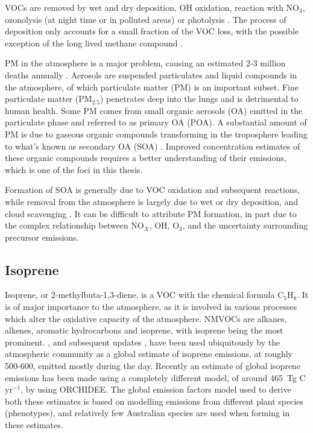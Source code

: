   VOCs are removed by wet and dry deposition, OH oxidation, reaction with NO$_3$, ozonolysis (at night time or in polluted areas) or photolysis \citep{AtkinsonArey2003, Brown2009}.
  The process of deposition only accounts for a small fraction of the VOC loss, with the possible exception of the long lived methane compound \citep{AtkinsonArey2003}.
  
  PM in the atmosphere is a major problem, causing an estimated 2-3 million deaths annually \citep{Hoek2013, Krewski2009, Silva2013, Lelieveld2015}. 
  Aerosols are suspended particulates and liquid compounds in the atmosphere, of which particulate matter (PM) is an important subset.
  Fine particulate matter (PM$_{2.5}$) penetrates deep into the lungs and is detrimental to human health.
  Some PM comes from small organic aerosols (OA) emitted in the particulate phase and referred to as primary OA (POA).
  A substantial amount of PM is due to gaseous organic compounds transforming in the troposphere leading to what's known as secondary OA (SOA) \citep{Kroll2008}.
  Improved concentration estimates of these organic compounds requires a better understanding of their emissions, which is one of the foci in this thesis.
  
  Formation of SOA is generally due to VOC oxidation and subsequent reactions, while removal from the atmosphere is largely due to wet or dry deposition, and cloud scavenging \citep{Kanakidou2005}.
  It can be difficult to attribute PM formation, in part due to the complex relationship between NO$_X$, OH, O$_3$, and the uncertainty surrounding precursor emissions.
  
  
  \subsection{Isoprene}
  \label{LR:VOCs:Isop}
    Isoprene, or 2-methylbuta-1,3-diene, is a VOC with the chemical formula C$_5$H$_8$. 
    It is of major importance to the atmosphere, as it is involved in various processes which alter the oxidative capacity of the atmosphere.
    NMVOCs are alkanes, alkenes, aromatic hydrocarbons and isoprene, with isoprene being the most prominent.
    \cite{Guenther1995}, and subsequent updates \citep{Guenther2000,Guenther2006,Guenther2012}, have been used ubiquitously by the atmospheric community as a global estimate of isoprene emissions, at roughly 500-600\tgpyr, emitted mostly during the day.
    Recently an estimate of global isoprene emissions has been made using a completely different model, of around 465~Tg C yr$^{-1}$, by \cite{Messina2016} using ORCHIDEE.
    The global emission factors model used to derive both these estimates is based on modelling emissions from different plant species (phenotypes), and relatively few Australian species are used when forming in these estimates.
    
